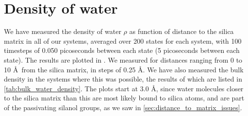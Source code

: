 \section{Density of water\label{sec:results_first_sec}}

We have measured the density of water $\rho$ as function of distance to the silica matrix in all of our systems, averaged over 200 states for each system, with 100 timesteps of 0.050 picoseconds between each state (5 picoseconds between each state). The results are plotted in . We measured for distances ranging from 0 to 10 \AA\ from the silica matrix, in steps of 0.25 \AA. We have also measured the bulk density in the systems where this was possible, the results of which are listed in \cref{tab:bulk_water_density}. The plots start at 3.0 \AA, since water molecules closer to the silica matrix than this are most likely bound to silica atoms, and are part of the passivating silanol groups, as we saw in \cref{sec:distance_to_matrix_issues}.%
%
